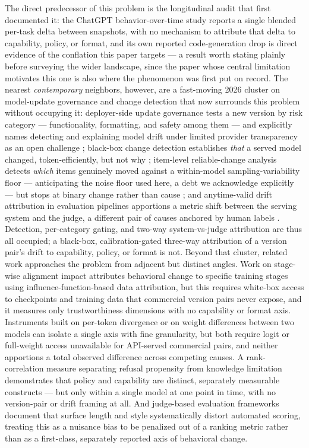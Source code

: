 \documentclass[11pt]{article}
\begin{document}
The direct predecessor of this problem is the longitudinal audit that first documented it: the ChatGPT behavior-over-time study \citep{ChatGPTBehavior2307} reports a single blended per-task delta between snapshots, with no mechanism to attribute that delta to capability, policy, or format, and its own reported code-generation drop is direct evidence of the conflation this paper targets --- a result worth stating plainly before surveying the wider landscape, since the paper whose central limitation motivates this one is also where the phenomenon was first put on record. The nearest \emph{contemporary} neighbors, however, are a fast-moving 2026 cluster on model-update governance and change detection that now surrounds this problem without occupying it: deployer-side update governance tests a new version by risk category --- functionality, formatting, and safety among them --- and explicitly names detecting and explaining model drift under limited provider transparency as an open challenge \citep{TestBeforeYouDeploy7789}; black-box change detection establishes \emph{that} a served model changed, token-efficiently, but not why \citep{TokenEfficientChangeDet1083}; item-level reliable-change analysis detects \emph{which} items genuinely moved against a within-model sampling-variability floor --- anticipating the noise floor used here, a debt we acknowledge explicitly --- but stops at binary change rather than cause \citep{BeyondTheMean7405}; and anytime-valid drift attribution in evaluation pipelines apportions a metric shift between the serving system and the judge, a different pair of causes anchored by human labels \citep{WhoDrifted5474}. Detection, per-category gating, and two-way system-vs-judge attribution are thus all occupied; a black-box, calibration-gated three-way attribution of a version pair's drift to capability, policy, or format is not. Beyond that cluster, related work approaches the problem from adjacent but distinct angles. Work on stage-wise alignment impact \citep{MoreRLHFMoreTrustFpiC} attributes behavioral change to specific training stages using influence-function-based data attribution, but this requires white-box access to checkpoints and training data that commercial version pairs never expose, and it measures only trustworthiness dimensions with no capability or format axis. Instruments built on per-token divergence \citep{FewTokensDeep6Mxh} or on weight differences \citep{DiffInterpretation6As4} between two models can isolate a single axis with fine granularity, but both require logit or full-weight access unavailable for API-served commercial pairs, and neither apportions a total observed difference across competing causes. A rank-correlation measure separating refusal propensity from knowledge limitation \citep{RefusalIndex9gJB} demonstrates that policy and capability are distinct, separately measurable constructs --- but only within a single model at one point in time, with no version-pair or drift framing at all. And judge-based evaluation frameworks \citep{WildBenchMKEH} document that surface length and style systematically distort automated scoring, treating this as a nuisance bias to be penalized out of a ranking metric rather than as a first-class, separately reported axis of behavioral change.
\end{document}

